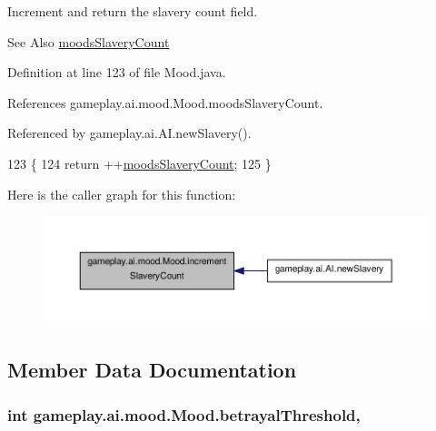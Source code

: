 Increment and return the slavery count field. 

\begin{DoxySeeAlso}{See Also}
\hyperlink{classgameplay_1_1ai_1_1mood_1_1_mood_a0bfc4bebdf6767b8c32e747ec21da39e}{moods\-Slavery\-Count} 
\end{DoxySeeAlso}


Definition at line 123 of file Mood.\-java.



References gameplay.\-ai.\-mood.\-Mood.\-moods\-Slavery\-Count.



Referenced by gameplay.\-ai.\-A\-I.\-new\-Slavery().


\begin{DoxyCode}
123                                        \{
124         \textcolor{keywordflow}{return} ++\hyperlink{classgameplay_1_1ai_1_1mood_1_1_mood_a0bfc4bebdf6767b8c32e747ec21da39e}{moodsSlaveryCount};
125     \}
\end{DoxyCode}


Here is the caller graph for this function\-:\nopagebreak
\begin{figure}[H]
\begin{center}
\leavevmode
\includegraphics[width=350pt]{classgameplay_1_1ai_1_1mood_1_1_mood_ac416312a82ad5afce4090858b47b0c96_icgraph}
\end{center}
\end{figure}




\subsection{Member Data Documentation}
\hypertarget{classgameplay_1_1ai_1_1mood_1_1_mood_af8ba28f8a5e568f223c07e0acb788be9}{
\subsubsection[{betrayal\-Threshold}]{\setlength{\rightskip}{0pt plus 5cm}int gameplay.\-ai.\-mood.\-Mood.\-betrayal\-Threshold\hspace{0.3cm}{\ttfamily [protected]}, {\ttfamily [inherited]}}}\label{classgameplay_1_1ai_1_1mood_1_1_mood_af8ba28f8a5e568f223c07e0acb788be9}



